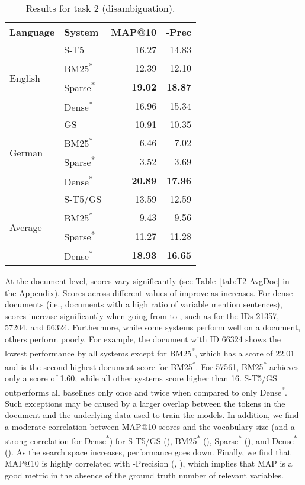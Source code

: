\documentclass[11pt]{article}
\begin{document}
\begin{table}[]
    \centering
    \begin{tabular}{l|l|r|r}
    Language &  System &  MAP@10 &  -Prec \\\hline
    \hline
      \multirow{4}{*}{English} &    S-T5 &    16.27 &   14.83 \\&    BM25\textsuperscript{*} &   12.39 &   12.10 \\&    Sparse\textsuperscript{*} &   \textbf{19.02} &   \textbf{18.87} \\&    Dense\textsuperscript{*} &   16.96 &   15.34 \\\hline
      \multirow{4}{*}{German} &    GS &   10.91 &   10.35 \\&    BM25\textsuperscript{*} &   6.46 &    7.02 \\&    Sparse\textsuperscript{*} &   3.52 &    3.69 \\&    Dense\textsuperscript{*} &  \textbf{20.89} &   \textbf{17.96} \\\hline
    \multirow{4}{*}{Average} &    S-T5/GS &   13.59 &   12.59 \\&    BM25\textsuperscript{*} &   9.43 &   9.56 \\&    Sparse\textsuperscript{*} &  11.27 &  11.28 \\&    Dense\textsuperscript{*} &  \textbf{18.93} &  \textbf{16.65} \\\hline
    \end{tabular}
    \caption{Results for task 2 (disambiguation).}
    \label{tab:T2-Avg}
\end{table}

At the document-level, scores vary significantly (see Table~\ref{tab:T2-AvgDoc} in the Appendix).
Scores across different values of  improve as  increases.
For dense documents (i.e., documents with a high ratio of variable mention sentences), scores increase significantly when going from  to , such as for the IDs 21357, 57204, and 66324.
Furthermore, while some systems perform well on a document, others perform poorly.
For example, the document with ID 66324 shows the lowest performance by all systems except for BM25\textsuperscript{*}, which has a score of 22.01 and is the second-highest document score for BM25\textsuperscript{*}.
For 57561, BM25\textsuperscript{*} achieves only a score of 1.60, while all other systems score higher than 16.
S-T5/GS outperforms all baselines only once and twice when compared to only Dense\textsuperscript{*}.
Such exceptions may be caused by a larger overlap between the tokens in the document and the underlying data used to train the models.
In addition, we find a moderate correlation between MAP@10 scores and the vocabulary size (and a strong correlation for Dense\textsuperscript{*}) for S-T5/GS (), BM25\textsuperscript{*} (), Sparse\textsuperscript{*} (), and Dense\textsuperscript{*} ().
As the search space increases, performance goes down.
Finally, we find that MAP@10 is highly correlated with -Precision (, ), which implies that MAP is a good metric in the absence of the ground truth number of relevant variables.
\end{document}
